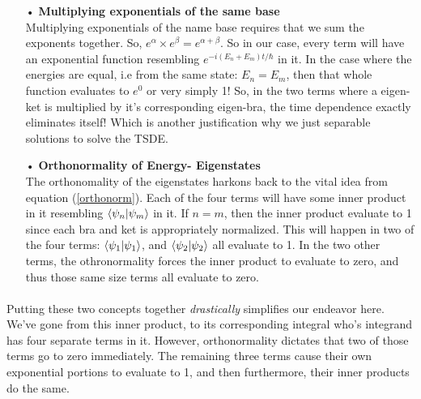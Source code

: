 \documentclass[12pt,letterpaper]{book}
\begin{document}
\begin{enumerate}

\item[•]\textbf{Multiplying exponentials of the same base}\\
Multiplying exponentials of the name base requires that we sum the exponents together. So, $e^{\alpha} \times e^{\beta} = e^{\alpha + \beta}$. So in our case, every term will have an exponential function resembling $e^{-i(E_n + E_m)t/\hbar}$ in it. In the case where the energies are equal, i.e from the same state: $E_n = E_m$, then that whole function evaluates to $e^0$ or very simply 1! So, in the two terms where a eigen-ket is multiplied by it's corresponding eigen-bra, the time dependence exactly eliminates itself! Which is another justification why we just separable solutions to solve the TSDE. 

\item[•]\textbf{Orthonormality of Energy- Eigenstates}\\
The orthonomality of the eigenstates harkons back to the vital idea from equation (\ref{orthonorm}). Each of the four terms will have some inner product in it resembling $\braket{\psi_n}{\psi_m}$ in it. If $n = m$, then the inner product evaluate to 1 since each bra and ket is appropriately normalized. This will happen in two of the four terms: $\braket{\psi_1}{\psi_1}$, and 
$\braket{\psi_2}{\psi_2}$ all  evaluate to 1.  In the two other terms, the othronormality forces the inner product to evaluate to zero, and thus those same size terms all evaluate to zero.
\end{enumerate}

\paragraph*{}Putting these two concepts together \textit{drastically} simplifies our endeavor here. We've gone from this inner product, to its corresponding integral who's integrand has four separate terms in it. However, orthonormality dictates that two of those terms go to zero immediately. The remaining three terms cause their own exponential portions to evaluate to 1, and then furthermore, their inner products do the same. 
\end{document}
